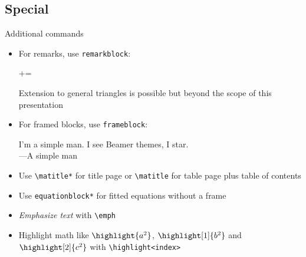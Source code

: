 \documentclass{beamer}
\begin{document}
\subsection{Special}

\begin{frame}[fragile]{Additional commands}
\begin{itemize}
	\item For remarks, 	use \texttt{remarkblock}:
    \begin{equationblock}
	+=
	\end{equationblock}
	\begin{remarkblock}
		\centering Extension to general triangles is possible but beyond the scope of this presentation
	\end{remarkblock}

	\item For framed blocks, use \texttt{frameblock}:
	\begin{frameblock}
		I'm a simple man. I see Beamer themes, I star.\\
		\phantom{}\hfill ---A simple man
	\end{frameblock}

	\item Use \verb|\matitle*| for title page or \verb|\matitle| for table page plus table of contents
	
	\item Use \verb|equationblock*| for fitted equations without a frame
	\item \emph{Emphasize text} with \verb|\emph|
	\item Highlight math like $\highlight{a^2}$, $\highlight[1]{b^2}$ and $\highlight[2]{c^2}$ with \verb|\highlight<index>|
\end{itemize}
\end{frame}
\end{document}
